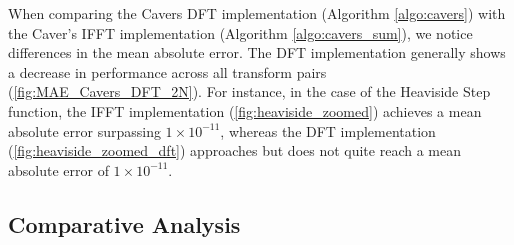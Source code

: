 \documentclass[a4paper]{report}
\begin{document}
When comparing the Cavers DFT implementation (Algorithm \ref{algo:cavers}) with the Caver's IFFT implementation (Algorithm \ref{algo:cavers_sum}), we notice differences in the mean absolute error. The DFT implementation generally shows a decrease in performance across all transform pairs (\autoref{fig:MAE_Cavers_DFT_2N}). For instance, in the case of the Heaviside Step function, the IFFT implementation (\autoref{fig:heaviside_zoomed}) achieves a mean absolute error surpassing $1 \times 10^{-11}$, whereas the DFT implementation (\autoref{fig:heaviside_zoomed_dft}) approaches but does not quite reach a mean absolute error of $1 \times 10^{-11}$.

\subsection{Comparative Analysis}
\end{document}
